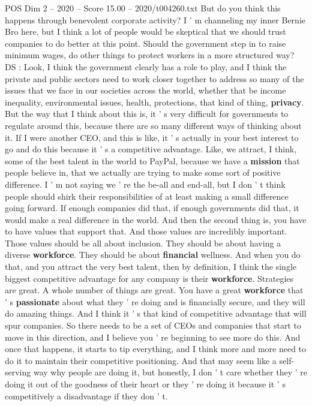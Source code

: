 \begin{textsample}{POS Dim 2 – 2020 – Score 15.00 – 2020/t004260.txt}
But do you think this happens through benevolent corporate activity?
I ' m channeling my inner Bernie Bro here, but I think a lot of people would be skeptical that we should trust companies to do better at this point.
Should the government step in to raise minimum wages, do other things to protect workers in a more structured way?
DS : Look, I think the government clearly has a role to play, and I think the private and public sectors need to work closer together to address so many of the issues that we face in our societies across the world, whether that be income inequality, environmental issues, health, protections, that kind of thing, \textbf{privacy}.
But the way that I think about this is, it ' s very difficult for governments to regulate around this, because there are so many different ways of thinking about it.
If I were another CEO, and this is like, it ' s actually in your best interest to go and do this because it ' s a competitive advantage.
Like, we attract, I think, some of the best talent in the world to PayPal, because we have a \textbf{mission} that people believe in, that we actually are trying to make some sort of positive difference.
I ' m not saying we ' re the be-all and end-all, but I don ' t think people should shirk their responsibilities of at least making a small difference going forward.
If enough companies did that, if enough governments did that, it would make a real difference in the world.
And then the second thing is, you have to have values that support that.
And those values are incredibly important.
Those values should be all about inclusion.
They should be about having a diverse \textbf{workforce}.
They should be about \textbf{financial} wellness.
And when you do that, and you attract the very best talent, then by definition, I think the single biggest competitive advantage for any company is their \textbf{workforce}.
Strategies are great.
A whole number of things are great.
You have a great \textbf{workforce} that ' s \textbf{passionate} about what they ' re doing and is financially secure, and they will do amazing things.
And I think it ' s that kind of competitive advantage that will spur companies.
So there needs to be a set of CEOs and companies that start to move in this direction, and I believe you ' re beginning to see more do this.
And once that happens, it starts to tip everything, and I think more and more need to do it to maintain their competitive positioning.
And that may seem like a self-serving way why people are doing it, but honestly, I don ' t care whether they ' re doing it out of the goodness of their heart or they ' re doing it because it ' s competitively a disadvantage if they don ' t.

\end{textsample}
